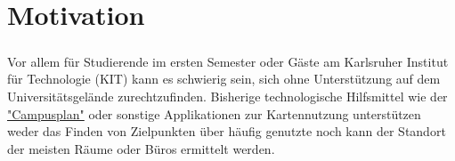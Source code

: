 \chapter{Motivation}

\paragraph{}
Vor allem für Studierende im ersten Semester oder Gäste am Karlsruher Institut für Technologie (KIT) 
kann es schwierig sein, sich ohne Unterstützung auf dem Universitätsgelände zurechtzufinden. Bisherige 
technologische Hilfsmittel wie der \href{https://www.kit.edu/campusplan/}{"Campusplan"} oder sonstige Applikationen
zur Kartennutzung unterstützen weder das Finden von Zielpunkten über häufig genutzte %
noch kann der Standort der meisten Räume oder Büros ermittelt werden.
